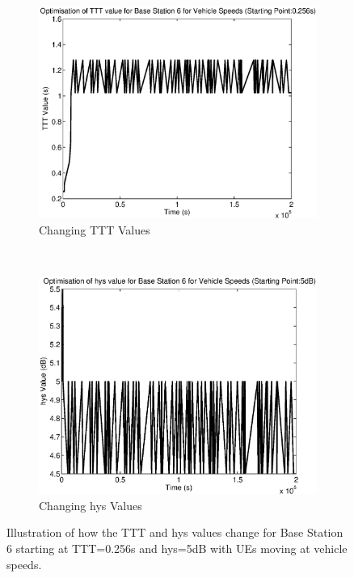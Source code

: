 \begin{figure}[H]
        \centering
        \begin{subfigure}[b]{0.49\textwidth}
                \includegraphics[width=\textwidth]{figures/graphs/vehmid/TTT6.eps}
                \caption{Changing TTT Values}
        \end{subfigure}%
        ~ %
        \begin{subfigure}[b]{0.49\textwidth}
                \includegraphics[width=\textwidth]{figures/graphs/vehmid/hys6.eps}
                \caption{Changing hys Values}
        \end{subfigure}
        \caption{Illustration of how the TTT and hys values change for Base Station 6 starting at TTT=0.256s and hys=5dB with UEs moving at vehicle speeds.}
\end{figure}
